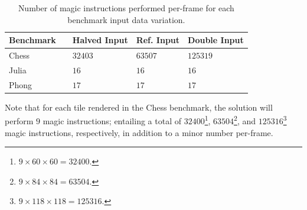 \begin{table}
  \centering
  \begin{tabular}{lllll}
    Benchmark & \phantom{Input Data} & Halved Input & Ref. Input & Double Input \\ \hline
    Chess & \phantom{No. Tiles} & $32403$ & $63507$ & $125319$ \\
    Julia & \phantom{No. Iterations} & $16$ & $16$ & $16$ \\
    Phong & \phantom{Texture Resolution} & $17$ & $17$ & $17$ \\
  \end{tabular}
  \caption[Input data variation magic instruction count]{Number of magic instructions performed per-frame for each benchmark input data variation.}
  \label{tab:keyvalsmagicinstructions}
\end{table}

Note that for each tile rendered in the Chess benchmark, the solution will perform $9$ magic instructions; entailing a total of $32400$\footnote{$9\times60\times60=32400$.}, $63504$\footnote{$9\times84\times84=63504$.}, and $125316$\footnote{$9\times118\times118=125316$.} magic instructions, respectively, in addition to a minor number per-frame.

